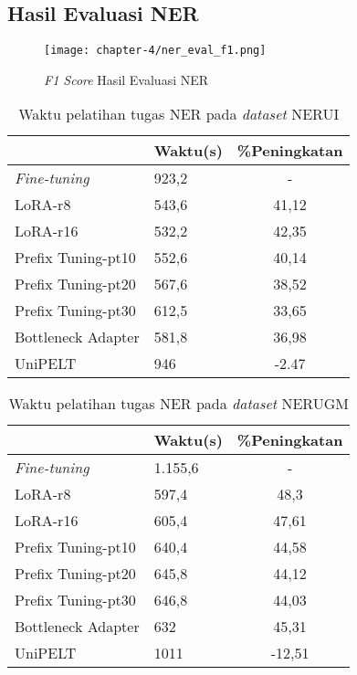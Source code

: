 \subsection{Hasil Evaluasi NER}

\begin{figure}[h]
    \centering
    \texttt{[image: chapter-4/ner\_eval\_f1.png]}
    \caption{\textit{F1 Score} Hasil Evaluasi NER}
    \label{fig:f1-ner}
\end{figure}

\begin{table}[h]
    \centering
    \caption{Waktu pelatihan tugas NER pada \textit{dataset} NERUI}
    \label{table:runtime-nerui}
    \begin{tabular}{|l|l|c|}
        \hline \rowcolor{black!10}
        \multicolumn{1}{|c|}{\textbf{Metode}} & \multicolumn{1}{|c|}{\textbf{Waktu(s)}} & \textbf{\%Peningkatan} \\ \hline
        \textit{Fine-tuning} & 923,2 & -  \\ \hline
        LoRA-r8 & 543,6 & 41,12 \\ \hline
        LoRA-r16 & 532,2 & 42,35 \\ \hline
        Prefix Tuning-pt10 & 552,6 & 40,14 \\ \hline
        Prefix Tuning-pt20 & 567,6 & 38,52 \\ \hline
        Prefix Tuning-pt30 & 612,5 & 33,65 \\ \hline
        Bottleneck Adapter & 581,8 & 36,98 \\ \hline
        UniPELT & 946 & -2.47 \\ \hline
    \end{tabular}
\end{table}

\begin{table}[h]
    \centering
    \caption{Waktu pelatihan tugas NER pada \textit{dataset} NERUGM}
    \label{table:runtime-nerugm}
    \begin{tabular}{|l|l|c|}
        \hline \rowcolor{black!10}
        \multicolumn{1}{|c|}{\textbf{Metode}} & \multicolumn{1}{|c|}{\textbf{Waktu(s)}} & \textbf{\%Peningkatan} \\ \hline
        \textit{Fine-tuning} & 1.155,6 & -  \\ \hline
        LoRA-r8 & 597,4 & 48,3 \\ \hline
        LoRA-r16 & 605,4 & 47,61 \\ \hline
        Prefix Tuning-pt10 & 640,4 & 44,58 \\ \hline
        Prefix Tuning-pt20 & 645,8 & 44,12 \\ \hline
        Prefix Tuning-pt30 & 646,8 & 44,03\\ \hline
        Bottleneck Adapter & 632 & 45,31 \\ \hline
        UniPELT & 1011 & -12,51 \\ \hline
    \end{tabular}
\end{table}

